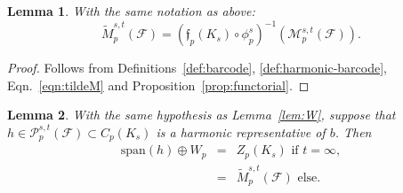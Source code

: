 \documentclass[11pt]{amsart}
\theoremstyle{theorem}
\newtheorem{lemma}{Lemma}[section]
\theoremstyle{remark}
\theoremstyle{definition}
\begin{document}
\begin{lemma}
\label{lem:tildeM-harmonictildeM}
With the same notation as above:
\[
\widetilde{M}^{s,t}_p(\mathcal{F}) = (\mathfrak{f}_p(K_s)\circ \phi_p^s)^{-1}(\mathcal{M}_p^{s,t}(\mathcal{F})).
\]
\end{lemma}

\begin{proof}
    Follows from Definitions~\ref{def:barcode}, \ref{def:harmonic-barcode},
    Eqn.~\eqref{eqn:tildeM} and Proposition~\ref{prop:functorial}.
\end{proof}

\begin{lemma}
\label{lem:h}
    With the same hypothesis as Lemma~\ref{lem:W}, suppose that
    $h \in \mathcal{P}^{s,t}_p(\mathcal{F}) \subset C_p(K_s)$ is a harmonic representative of $b$.  %
    Then
    \begin{eqnarray*}
    \mathrm{span}(h) \oplus  W_p &=& Z_p(K_s) \text{ if $t = \infty$},\\
        &=& \widetilde{M}^{s,t}_p(\mathcal{F}) \text{ else}.
    \end{eqnarray*}
\end{lemma}
\end{document}
